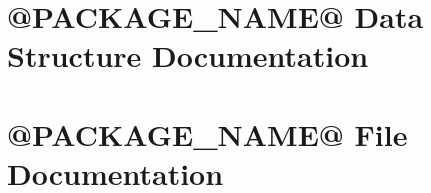 \documentclass[letterpaper]{book}
\begin{document}
\chapter{@PACKAGE\_\-NAME@ Data Structure Documentation}























\chapter{@PACKAGE\_\-NAME@ File Documentation}






















































\printindex
\end{document}
